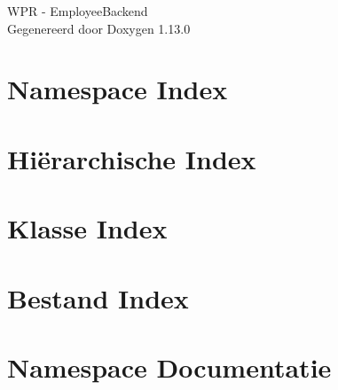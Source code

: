 \documentclass[twoside]{book}
\newcommand{\+}{\discretionary{\mbox{\scriptsize$\hookleftarrow$}}{}{}}
\newcommand{\clearemptydoublepage}{%
    \newpage{\pagestyle{empty}\cleardoublepage}%
  }
\begin{document}
  \raggedbottom
    \hypersetup{pageanchor=false,
                bookmarksnumbered=true,
                pdfencoding=unicode
               }
  \begin{titlepage}
  \vspace*{7cm}
  \begin{center}%
  {\Large WPR -\/ Employee\+Backend}\\
  \vspace*{1cm}
  {\large Gegenereerd door Doxygen 1.13.0}\\
  \end{center}
  \end{titlepage}
  \clearemptydoublepage
  \tableofcontents
  \clearemptydoublepage
  \hypersetup{pageanchor=true}
\chapter{Namespace Index}

\chapter{Hiërarchische Index}

\chapter{Klasse Index}

\chapter{Bestand Index}

\chapter{Namespace Documentatie}













\end{document}
